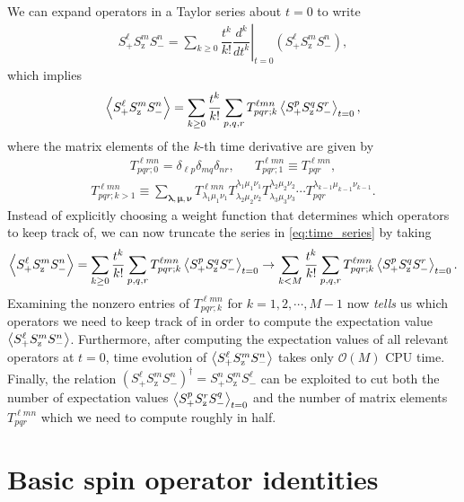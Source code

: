 \documentclass[aps,notitlepage,nofootinbib,11pt]{revtex4-1}
\newcommand{\f}[2]{\dfrac{#1}{#2}} %
\newcommand{\p}[1]{\left(#1\right)} %
\renewcommand{\v}{\bm} %
\newcommand{\bk}{\Braket} %
\renewcommand{\O}{\mathcal{O}}
\newcommand{\z}{\text{z}}
\newcommand{\1}{\mathds{1}}
\begin{document}
We can expand operators in a Taylor series about $t=0$ to write
\begin{align}
  S_+^\ell S_\z^m S_-^n
  = \sum_{k\ge0} \f{t^k}{k!}
  \left.\f{d^k}{dt^k}\right|_{t=0} \p{S_+^\ell S_\z^m S_-^n},
\end{align}
which implies
\begin{align}
  \bk{S_+^\ell S_\z^m S_-^n}
  = \sum_{k\ge0} \f{t^k}{k!}
  \sum_{p,q,r} T^{\ell m n}_{pqr;k} \bk{S_+^p S_\z^q S_-^r}_{t=0},
  \label{eq:time_series}
\end{align}
where the matrix elements of the $k$-th time derivative are given by
\begin{align}
  T^{\ell m n}_{pqr;0}=\delta_{\ell p}\delta_{mq}\delta_{nr},
  &&
  T^{\ell m n}_{pqr;1}\equiv T^{\ell m n}_{pqr},
\end{align}
\begin{align}
  T^{\ell mn}_{pqr;k>1}
  \equiv \sum_{\v\lambda,\v\mu,\v\nu}
  T^{\ell mn}_{\lambda_1 \mu_1 \nu_1}
  T^{\lambda_1 \mu_1 \nu_1}_{\lambda_2 \mu_2 \nu_2}
  T^{\lambda_2 \mu_2 \nu_2}_{\lambda_3 \mu_3 \nu_3}
  \cdots T^{\lambda_{k-1} \mu_{k-1} \nu_{k-1}}_{pqr}.
\end{align}
Instead of explicitly choosing a weight function that determines which
operators to keep track of, we can now truncate the series in
\eqref{eq:time_series} by taking
\begin{align}
  \bk{S_+^\ell S_\z^m S_-^n}
  = \sum_{k\ge0} \f{t^k}{k!}
  \sum_{p,q,r} T^{\ell m n}_{pqr;k} \bk{S_+^p S_\z^q S_-^r}_{t=0}
  \to \sum_{k<M} \f{t^k}{k!}
  \sum_{p,q,r} T^{\ell m n}_{pqr;k} \bk{S_+^p S_\z^q S_-^r}_{t=0}.
\end{align}
Examining the nonzero entries of $T^{\ell mn}_{pqr;k}$ for
$k=1,2,\cdots,M-1$ now {\it tells} us which operators we need to keep
track of in order to compute the expectation value
$\bk{S_+^\ell S_\z^m S_-^n}$.  Furthermore, after computing the
expectation values of all relevant operators at $t=0$, time evolution
of $\bk{S_+^\ell S_\z^m S_-^n}$ takes only $\O\p{M}$ CPU time.
Finally, the relation
$\p{S_+^\ell S_\z^m S_-^n}^\dag=S_+^n S_\z^m S_-^\ell$ can be
exploited to cut both the number of expectation values
$\bk{S_+^p S_\z^r S_-^q}_{t=0}$ and the number of matrix elements
$T^{\ell mn}_{pqr}$ which we need to compute roughly in half.




\newpage
\appendix

\section{Basic spin operator identities}
\label{sec:identities}
\end{document}

